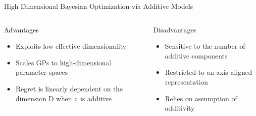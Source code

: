 

\begin{frame}[c]{High Dimensional Bayesian Optimization via Additive Models}
\begin{columns}[T] %
\begin{column}{.48\textwidth}


    \begin{block}{Advantages}
    \begin{itemize}
    	\item Exploits low effective dimensionality
    	\item Scales GPs to high-dimensional parameter spaces
    	\item Regret is linearly dependent on the dimension D when $c$ is additive
    \end{itemize}
    \end{block}
\pause
\end{column}%

\hfill%

\begin{column}{.48\textwidth}

    \begin{block}{Disadvantages}
    \begin{itemize}
    	\item Sensitive to the number of additive components
    	\item Restricted to an axis-aligned representation
        \item Relies on assumption of additivity
    \end{itemize}
\end{block}

\end{column}
\end{columns}   
\end{frame}


